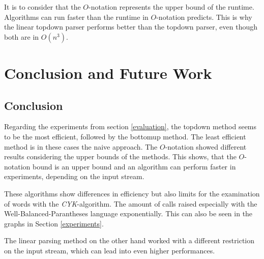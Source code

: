 \documentclass[a4paper, 11pt]{article}
\begin{document}
It is to consider that the $O$-notation represents the upper bound of the runtime. Algorithms can run faster than the runtime in $O$-notation predicts. This is why the linear topdown parser performs better than the topdown parser, even though both are in $O(n^3)$.










\pagebreak















\newpage

\section{Conclusion and Future Work}
\label{conclusion}


\subsection{Conclusion}


Regarding the experiments from section \ref{evaluation}, the topdown method seems to be the most efficient, followed by the bottomup method. The least efficient method is in these cases the naive approach. The $O$-notation showed different results considering the upper bounds of the methods. This shows, that the $O$-notation bound is an upper bound and an algorithm can perform faster in experiments, depending on the input stream.


These algorithms show differences in efficiency but also limits for the examination of words with the \textit{CYK}-algorithm. The amount of calls raised especially with the Well-Balanced-Parantheses language exponentially. This can also be seen in the graphs in Section \ref{experiments}.

The linear parsing method on the other hand worked with a different restriction on the input stream, which can lead into even higher performances.
\end{document}

